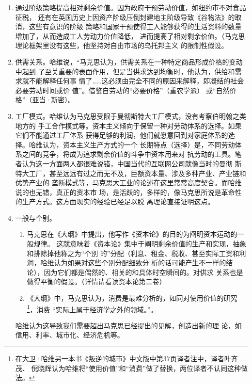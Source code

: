 \begin{enumerate}
\item 通过阶级策略提高相对剩余价值。因为政府干预劳动价值，如纽约市不对食品征税，
还有在英国历史上因资产阶级压倒封建地主阶级导致《谷物法》的取消，这些有意识的阶级
策略和国家干预使得工人能够获得的生活资料的数量增加了，从而造成工人劳动力价值降低，
进而提高了相对剩余价值。（马克思理论框架里没有这些，他坚持对自由市场的乌托邦主义
的限制性假设。

\item 供需关系。哈维说，“马克思认为，供需关系在一种特定商品形成价格的变动中起到
  了至关重要的表面作用，但是当供求达到均衡时，他认为，供给和需求就不能解释任何事
  情了……这必须由完全不同的原因来解释，即凝结的社会必要劳动时间或价
  值”。借鉴自劳动的“必要价格”（重农学派）
  或“自然价格”（亚当·斯密）。

\item 工厂模式。哈维认为马克思受限于曼彻斯特大工厂模式，没有考察伯明翰之类地方的
手工合作模式等。资本主义倾向于保留一种对劳动体系的选择。如果它们不能通过工厂体系
获得足够的利润，他们就愿意回到对家庭体系的选择。哈维认为，资本主义生产方式的一个
长期特点（选择）是，不同劳动体系之间的竞争，将成为追求剩余价值的斗争中资本用来对
抗劳动的工具。笔者认为这一方面两人都很难说错，中国当代的互联网公司就像当时的曼彻
斯特大工厂，甚至远远有过之而无不及，巨额资本量、涉及多种产业、产业链和优势产业的
垄断模式等，马克思大工业的论述在这里常常高度契合。而哈维说的也无错，真正的资本市
场，是活跃的，多样的，像马克思所说是革命性的生产方式。这方面现实的经验已经足以脱
离理论直接证明这点。

\item 一般与个别。

  \begin{enumerate}
    \item 马克思在《大纲》中提出，他写作《资本论》的目的为阐明资本运动的一般规律。
这就意味着《资本论》集中于阐明剩余价值的生产和实现，抽象和排除掉他称之为“个别
的”分配（利息、租金、税收、甚至实际工资和利润，哈维认为如果对这些个别分配细致分
析的话可能产生不一样的结论），因为它们都是偶然的、相关的和具体时空瞬间的。对供求
关系也是做得平衡的假设。（详情请看读资本论第二卷）

    \item 《大纲》中，马克思认为，消费是最难分析的，如同对使用价值的研究
\footnote{在大卫·哈维另一本书《叛逆的城市》中文版中第37页译者注中，译者叶齐茂、
倪晓辉认为哈维将“使用价值”和“消费”做了替换，两位译者不认同这种做法。}，消费
“实际上属于经济学之外的领域。”。
    \end{enumerate}哈维认为这导致我们需要超出马克思已经提出的见解，创造出新的理
论，如信用、利率、城市化、经济危机等。

\end{enumerate}

